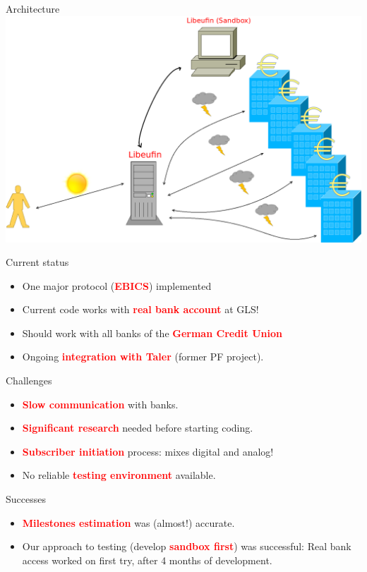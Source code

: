 \documentclass[pdf]{beamer}
\newcommand{\boldred}[1]{\textcolor{red}{\textbf{#1}}}
\begin{document}
\begin{frame}{Architecture}
  \includegraphics[height=0.63\textheight]{libeufin.png}
\end{frame}

\begin{frame}{Current status}
  \begin{itemize}
    \item One major protocol (\boldred{EBICS}) implemented
    \item Current code works with \boldred{real bank account} at GLS!
    \item Should work with all banks of the \boldred{German Credit Union}
    \item Ongoing \boldred{integration with Taler} (former PF project).
  \end{itemize}
\end{frame}

\begin{frame}{Challenges}
  \begin{itemize}
    \item \boldred{Slow communication} with banks.
    \item \boldred{Significant research} needed before starting coding.
    \item \boldred{Subscriber initiation} process: mixes digital and analog!
    \item No reliable \boldred{testing environment} available.
  \end{itemize}
\end{frame}

\begin{frame}{Successes}
  \begin{itemize}
    \item \boldred{Milestones estimation} was (almost!) accurate.
    \item Our approach to testing (develop \boldred{sandbox first}) was successful: Real bank access
          worked on first try, after 4 months of development.
  \end{itemize}
\end{frame}
\end{document}
